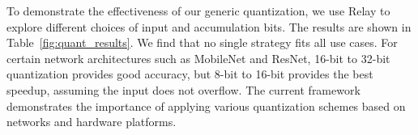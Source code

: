 To demonstrate the effectiveness of our generic quantization,
  we use Relay to explore
  different choices of input and accumulation bits.
The results are shown in Table~\ref{fig:quant_results}.
We find that no single strategy fits all use cases.
For certain network architectures such as MobileNet and ResNet, 16-bit to 32-bit
  quantization provides good accuracy,
   but 8-bit to 16-bit provides the best speedup,
  assuming the input does not overflow.
The current framework demonstrates the importance of applying
  various quantization schemes based on networks and hardware platforms.






